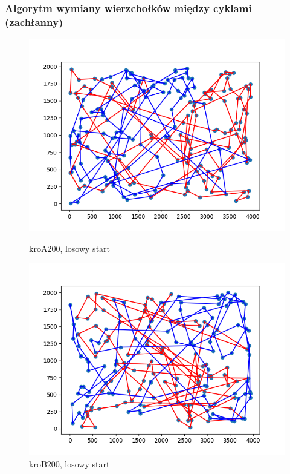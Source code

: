 \documentclass[11pt]{article}
\begin{document}
\subsubsection{Algorytm wymiany wierzchołków między cyklami (zachłanny)}
\begin{figure}[H]
    \centering
    \begin{minipage}[t]{0.45\textwidth}
        \centering
        \includegraphics[width=\linewidth]{best_paths/kroA200/traverse_greedy_shuffle/randomstart}
        \caption{kroA200, losowy start}
    \end{minipage}
    \hfill
    \begin{minipage}[t]{0.45\textwidth}
        \centering
        \includegraphics[width=\linewidth]{best_paths/kroB200/traverse_greedy_shuffle/randomstart}
        \caption{kroB200, losowy start}
    \end{minipage}


\end{figure}
\end{document}
